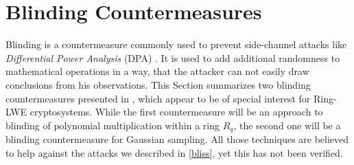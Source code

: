 %
%

\chapter{Blinding Countermeasures}
Blinding is a countermeasure commonly used to prevent side-channel attacks like \textit{Differential Power Analysis} (DPA) \cite{DBLP:conf/crypto/KocherJJ99}. It is used to add additional randomness to mathematical operations in a way, that the attacker can not easily draw conclusions from his observations. This Section summarizes two blinding countermeasures presented in \cite{cryptoeprint:2016:276}, which appear to be of special interest for Ring-LWE cryptosystems. While the first countermeasure will be an approach to blinding of polynomial multiplication within a ring \(R_q\), the second one will be a blinding countermeasure for Gaussian sampling. All those techniques are believed to help against the attacks we described in \ref{bliss}, yet this has not been verified.


